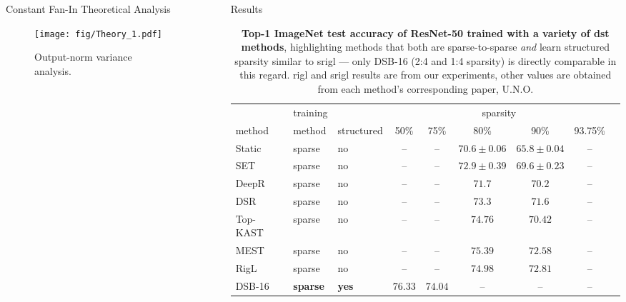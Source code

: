 \documentclass[final]{beamer}
\newlength{\sepwidth}
\newlength{\colwidth}
\newcommand{\separatorcolumn}{\begin{column}{\sepwidth}\end{column}}
\begin{document}
\begin{frame}[t]
\begin{columns}[t]
\begin{column}{\colwidth}
\begin{block}{Constant Fan-In Theoretical Analysis}
\begin{figure}
    \texttt{[image: fig/Theory\_1.pdf]}
    \caption{Output-norm variance analysis.}\label{fig:theory}
\end{figure}
\end{block}

\end{column}
\separatorcolumn
\begin{column}{\colwidth}
  \begin{block}{Results}
  \begin{table}[p]
  \vspace{-1em}
    \begin{threeparttable}
    \begin{center}
        \caption{\textbf{Top-1 ImageNet test accuracy of ResNet-50 trained with a variety of \gls{dst} methods}, highlighting methods that both are sparse-to-sparse \emph{and} learn structured sparsity similar to \gls{srigl} --- only DSB-16 (2:4 and 1:4  sparsity) is directly comparable in this regard. \gls{rigl} and \gls{srigl} results are from our experiments, other values are obtained from each method's corresponding paper, U.N.O.}\label{table:imagenet_benchmarks}
        \begin{tabular}{@{}p{6.0em}p{4.0em}p{5.5em}cccccc@{}}\toprule
        & training &  & \multicolumn{5}{c}{sparsity} \\
        \cmidrule(lr){4-8}
        method & method & structured & 50\% & 75\% & 80\% & 90\%  & 93.75\% \\
        \midrule
        Static\tnote{\textasteriskcentered} & sparse & no & -- & -- & $70.6\pm 0.06$ & $65.8\pm 0.04$ & -- \\ 
        SET\tnote{\textasteriskcentered} & sparse & no & -- & -- & $72.9\pm 0.39$ & $69.6\pm 0.23$ & -- \\  
        DeepR\tnote{\S} & sparse & no & -- & -- & $71.7$ & $70.2$ & -- \\ 
        DSR & sparse & no & -- & -- & $73.3$ & $71.6$ & -- \\  
        Top-KAST\tnote{\textdaggerdbl} & sparse & no & -- & -- & $74.76$ & $70.42$ & -- \\ 
        MEST\tnote{\textdagger} & sparse & no & -- & -- & $\mathbf{75.39}$ & $72.58$ & -- \\ 
        RigL & sparse & no & -- & -- & $74.98$ & $\mathbf{72.81}$ & -- \\ 
        DSB-16 & \textbf{sparse} & \textbf{yes} & $76.33$ & $74.04$ & -- & -- & -- \\ 

\end{tabular}
\end{center}
\end{threeparttable}
\end{table}
\end{block}
\end{column}
\end{columns}
\end{frame}
\end{document}
